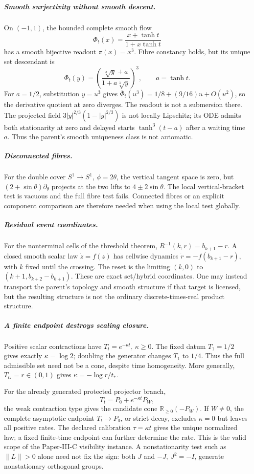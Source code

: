 \documentclass[11pt,a4paper]{article}
\begin{document}
\subparagraph{Smooth surjectivity without smooth descent.}
On \((-1,1)\), the bounded complete smooth flow
\[
 \Phi_t(x)=\frac{x+\tanh t}{1+x\tanh t}
\]
has a smooth bijective readout \(\pi(x)=x^3\). Fibre constancy holds,
but its unique set descendant is
\[
 \bar\Phi_t(y)=\left(\frac{\sqrt[3]{y}+a}{1+a\sqrt[3]{y}}\right)^3,
 \qquad a=\tanh t.
\]
For \(a=1/2\), substitution \(y=u^3\) gives
\(\bar\Phi_t(u^3)=1/8+(9/16)u+O(u^2)\), so the derivative quotient at
zero diverges. The readout is not a submersion there. The projected field
\(3|y|^{2/3}(1-|y|^{2/3})\) is not locally Lipschitz; its ODE admits both
stationarity at zero and delayed starts \(\tanh^3(t-a)\) after a waiting
time \(a\). Thus the parent's smooth uniqueness class is not automatic.

\subparagraph{Disconnected fibres.}
For the double cover \(S^1\to S^1\), \(\phi=2\theta\), the vertical
tangent space is zero, but \((2+\sin\theta)\partial_\theta\) projects at
the two lifts to \(4\pm2\sin\theta\). The local vertical-bracket test is
vacuous and the full fibre test fails. Connected fibres or an explicit
component comparison are therefore needed when using the local test globally.

\subparagraph{Residual event coordinates.}
For the nonterminal cells of the threshold theorem,
\(R^{-1}(k,r)=b_{k+1}-r\). A closed smooth scalar law \(\dot z=f(z)\)
has cellwise dynamics \(\dot r=-f(b_{k+1}-r)\), with \(k\) fixed until
the crossing. The reset is the limiting \((k,0)\) to
\((k+1,b_{k+2}-b_{k+1})\). These are exact set/hybrid coordinates.
One may instead transport the parent's topology and smooth structure if
that target is licensed, but the resulting structure is not the ordinary
discrete-times-real product structure.

\subparagraph{A finite endpoint destroys scaling closure.}
Positive scalar contractions have \(T_t=e^{-\kappa t}\), \(\kappa\ge0\).
The fixed datum \(T_1=1/2\) gives exactly \(\kappa=\log2\); doubling
the generator changes \(T_1\) to \(1/4\). Thus the full admissible set
need not be a cone, despite time homogeneity. More generally,
\(T_{t_*}=r\in(0,1)\) gives \(\kappa=-\log r/t_*\).

For the already generated protected projector branch,
\[
 T_t=P_0+e^{-\kappa t}P_W,
\]
the weak contraction type gives the candidate cone
\(\mathbb R_{\ge0}(-P_W)\). If \(W\ne0\), the complete asymptotic
endpoint \(T_t\to P_0\), or strict decay, excludes \(\kappa=0\) but
leaves all positive rates. The declared calibration \(\tau=\kappa t\)
gives the unique normalized law; a fixed finite-time endpoint can further
determine the rate. This is the valid scope of the Paper-III-C visibility
instance. A nonstationarity test such as \(\|L\|>0\) alone need not fix
the sign: both \(J\) and \(-J\), \(J^2=-I\), generate nonstationary
orthogonal groups.
\end{document}
